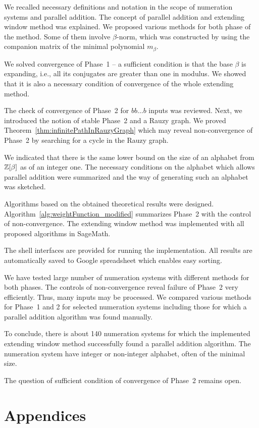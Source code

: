 \documentclass[11pt,a4paper]{report}	%
\theoremstyle{definition}
\begin{document}
We  recalled necessary definitions and notation in the scope of numeration systems and parallel addition. The concept of parallel addition and extending  window method was explained. We proposed various methods for both phase of the method. Some of them involve $\beta$-norm, which was constructed by using the companion matrix of the minimal polynomial $m_\beta$.

We solved convergence of Phase~1 -- a sufficient condition is that the base $\beta$ is expanding, i.e., all its conjugates are greater than one in modulus. We showed that it is also a necessary condition of convergence of the whole extending method. 

The check of convergence of Phase~2 for $bb\dots b$ inputs was reviewed. Next, we introduced the notion of stable Phase~2 and a Rauzy graph. We proved Theorem~\ref{thm:infinitePathInRauzyGraph} which may reveal non-convergence of Phase~2 by searching for a cycle in the Rauzy graph.

We indicated that there is the same lower bound on the size of an alphabet from $\mathbb{Z}[\beta]$ as of an integer one. The necessary conditions on the alphabet which allows parallel addition were summarized and the way of generating such an alphabet was sketched.

Algorithms based on the obtained theoretical results were designed. Algorithm~\ref{alg:weightFunction_modified} summarizes Phase~2 with the control of non-convergence. The extending window method was implemented with all proposed algorithms in SageMath.

The shell interfaces are provided for running the implementation. All results are automatically saved to Google spreadsheet which enables easy sorting.

We have tested large number of numeration systems with different methods for both phases. The controls of non-convergence reveal failure of Phase~2 very efficiently. Thus, many inputs may be processed. We compared various methods for Phase~1 and 2 for selected numeration systems including those for which a parallel addition algorithm was found manually.

 To conclude, there is about 140 numeration systems for which the implemented extending window method successfully found a parallel addition algorithm. The numeration system have integer or non-integer alphabet, often of the minimal size.

The question of sufficient condition of convergence of Phase~2 remains open.


\newpage



\appendix
\chapter*{Appendices}
\renewcommand{\thesection}{\Alph{section}}

\end{document}
